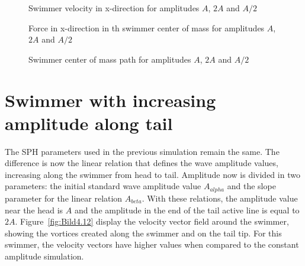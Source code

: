 \begin{figure}[H]
\centering
  \begin{footnotesize}
  
  \caption[Swimmer velocity in x-direction for amplitudes $A$, $2A$ and $A/2$ ]{Swimmer velocity in x-direction for amplitudes $A$, $2A$ and $A/2$ }
   \label{fig:Bild4.9}
  \end{footnotesize}
\end{figure} 

\begin{figure}[H]
\centering
  \begin{footnotesize}
  
  \caption[Force in x-direction in th swimmer center of mass for amplitudes $A$, $2A$ and $A/2$]{Force in x-direction in th swimmer center of mass for amplitudes $A$, $2A$ and $A/2$}
   \label{fig:Bild4.10}
  \end{footnotesize}
\end{figure} 

\begin{figure}[H]
\centering
  \begin{footnotesize}
  
  \caption[Swimmer center of mass path for amplitudes $A$, $2A$ and $A/2$]{Swimmer center of mass path for amplitudes $A$, $2A$ and $A/2$}
   \label{fig:Bild4.11}
  \end{footnotesize}
\end{figure}


\section{Swimmer with increasing amplitude along tail}
\label{sec:section 4}

The SPH parameters used in the previous simulation remain the same. The difference is now the linear relation that defines the wave amplitude values, increasing along the swimmer
from head to tail. Amplitude now is divided in two parameters: the initial standard wave amplitude value $A_{alpha}$ and the slope parameter for the linear relation $A_{beta}$.
With these relations, the amplitude value near the head is $A$ and the amplitude in the end of the tail active line is equal to $2A$. Figure~\ref{fig:Bild4.12} display the velocity
vector field around the swimmer, showing the vortices created along the swimmer and on the tail tip. For this swimmer, the velocity vectors have higher values when compared to the
constant amplitude simulation.
 


